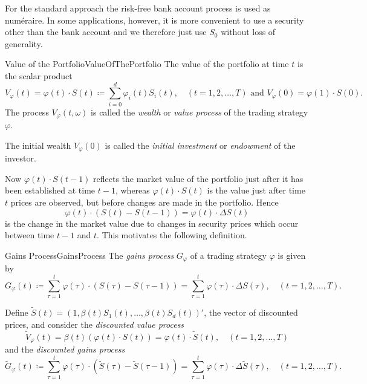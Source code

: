 For the standard approach the risk-free bank account process is used as num\'{e}raire. In some applications, however, it is more convenient to use a security other than the bank account and we therefore just use $S_0$ without loss of generality.

\begin{defn}{Value of the Portfolio}{ValueOfThePortfolio}
	The value of the portfolio at time $t$ is the scalar product
	\begin{equation*}
		V_\varphi(t) = \varphi(t) \cdot S(t) \coloneqq \sum_{i=0}^d \varphi_i(t)S_i(t), \quad (t=1, 2, \dots, T) \text{ and } V_\varphi(0) = \varphi(1) \cdot S(0).
	\end{equation*}
	The process $V_\varphi(t, \omega)$ is called the \emph{wealth} or \emph{value process} of the trading strategy $\varphi$.
\end{defn}

The initial wealth $V_\varphi(0)$ is called the \emph{initial investment} or \emph{endowment} of the investor.

Now $\varphi(t) \cdot S(t-1)$ reflects the market value of the portfolio just after it has been established at time $t-1$, whereas $\varphi(t) \cdot S(t)$ is the value just after time $t$ prices are observed, but before changes are made in the portfolio. Hence
\begin{equation*}
	\varphi(t) \cdot (S(t) - S(t-1)) = \varphi(t) \cdot \Delta S(t)
\end{equation*}
is the change in the market value due to changes in security prices which occur between time $t-1$ and $t$. This motivates the following definition.

\begin{defn}{Gains Process}{GainsProcess}
	The \emph{gains process} $G_\varphi$ of a trading strategy $\varphi$ is given by
	\begin{equation*}
		G_\varphi(t) \coloneqq \sum_{\tau=1}^t \varphi(\tau) \cdot (S(\tau) - S(\tau-1)) = \sum_{\tau=1}^t \varphi(\tau) \cdot \Delta S(\tau), \quad (t=1, 2, \dots, T).
	\end{equation*}
\end{defn}

Define $\tilde{S}(t) = (1, \beta(t)S_1(t), \dots, \beta(t)S_d(t))'$, the vector of discounted prices, and consider the \emph{discounted value process}
\begin{equation*}
	\tilde{V}_\varphi(t) = \beta(t)(\varphi(t) \cdot S(t)) = \varphi(t) \cdot \tilde{S}(t), \quad (t=1, 2, \dots, T)
\end{equation*}
and the \emph{discounted gains process}
\begin{equation*}
	\tilde{G}_\varphi(t) \coloneqq \sum_{\tau=1}^t \varphi(\tau) \cdot (\tilde{S}(\tau) - \tilde{S}(\tau-1)) = \sum_{\tau=1}^t \varphi(\tau) \cdot \Delta \tilde{S}(\tau), \quad (t=1, 2, \dots, T).
\end{equation*}

